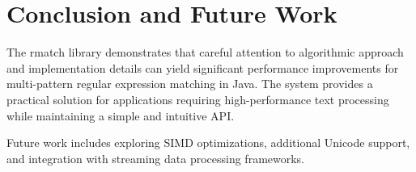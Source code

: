 \documentclass[twocolumn]{article}
\begin{document}
\section{Conclusion and Future Work}

The rmatch library demonstrates that careful attention to algorithmic approach and implementation details can yield significant performance improvements for multi-pattern regular expression matching in Java. The system provides a practical solution for applications requiring high-performance text processing while maintaining a simple and intuitive API.

Future work includes exploring SIMD optimizations, additional Unicode support, and integration with streaming data processing frameworks.



\end{document}
